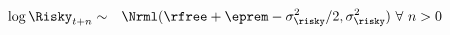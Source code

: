  \begin{equation}\begin{gathered}\begin{aligned}
        \log \Risky_{t+n} & \sim & \Nrml(\rfree + \eprem - \sigma^{2}_{\risky}/2,\sigma^{2}_{\risky}) ~\forall~n>0 \label{eq:distRisky}
      \end{aligned}\end{gathered}\end{equation}
